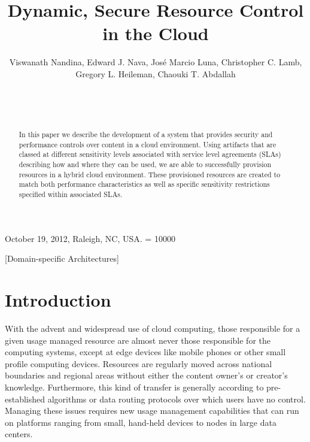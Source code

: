 \documentclass{acm_proc_article-sp}
\begin{document}
\title{Dynamic, Secure Resource Control in the Cloud}


\author{
\alignauthor
Viswanath Nandina, Edward J. Nava, Jos\'e Marcio Luna, Christopher C. Lamb, Gregory L. Heileman, Chaouki T. Abdallah\\
       \\
       \\
       \\
}

 {October 19, 2012, Raleigh, NC, USA.} 
\widowpenalty = 10000

\maketitle

\begin{abstract}
In this paper we describe the development of a system that provides security and performance controls over content in a cloud environment.  Using artifacts that are classed at different sensitivity levels associated with service level agreements (SLAs) describing how and where they can be used, we are able to successfully provision resources in a hybrid cloud environment.  These provisioned resources are created to match both performance characteristics as well as specific sensitivity restrictions specified within associated SLAs.
\end{abstract}

[Domain-specific Architectures]

\section{Introduction}\label{sec:introduction}
With the advent and widespread use of cloud computing, those responsible for a given usage managed resource are almost never those responsible for the computing systems, except at edge devices like mobile phones or other small profile computing devices.  Resources are regularly moved across national boundaries and regional areas without either the content owner's or creator's knowledge.  Furthermore, this kind of transfer is generally according to pre-established algorithms or data routing protocols over which users have no control.  Managing these issues requires new usage management capabilities that can run on platforms ranging from small, hand-held devices to nodes in large data centers.
\end{document}

